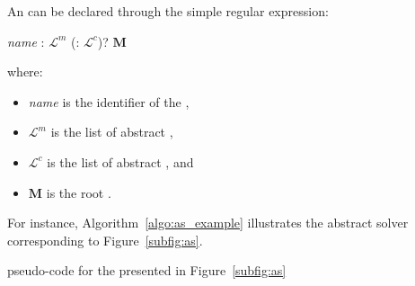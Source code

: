 An \as{} can be declared through the  simple regular expression:

\begin{center}
 {\it name} : $\mathcal{L}^m$ (: $\mathcal{L}^c$)?  $\mathbf{M}$ 
\end{center}

where:
\begin{itemize}
\item {\it name} is the identifier of the \as{}, 
\item $\mathcal{L}^m$ is the list of abstract \oms{},
\item $\mathcal{L}^c$ is the list of abstract \opchs{}, and
\item $\mathbf{M}$ is the root \cm.
\end{itemize}

For instance, Algorithm~\ref{algo:as_example} illustrates the abstract solver corresponding to Figure~\ref{subfig:as}.

\begin{algorithm}[H]
\dontprintsemicolon
\SetNoline
{}
\caption{\posl{} pseudo-code for the \as{} presented in Figure~\ref{subfig:as}}\label{algo:as_example}
\end{algorithm}	